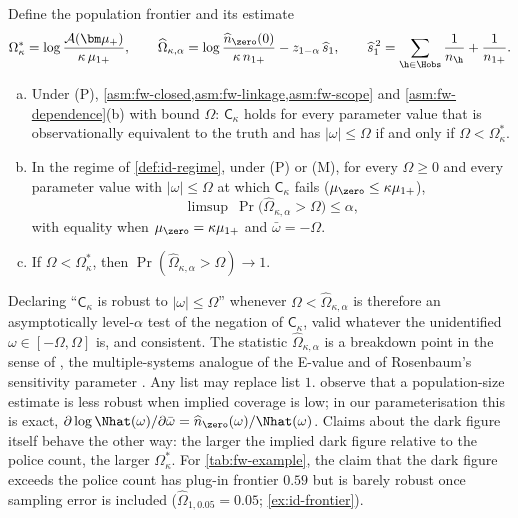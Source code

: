 \begin{theorem}\label{thm:id-frontier}
Define the population frontier and its estimate
\[
  \Omega^*_\kappa=\log\frac{\mathcal A(\bm\mu_+)}{\kappa\,\mu_{1+}},
  \qquad
  \widehat\Omega_{\kappa,\alpha}=\log\frac{\widehat n_{\zero}(0)}{\kappa\,n_{1+}}-z_{1-\alpha}\,\widehat s_1,
  \qquad
  \widehat s_1^{\,2}=\sum_{\h\in\Hobs}\frac1{n_{\h}}+\frac1{n_{1+}} .
\]
\begin{enumerate}[(a)]
  \item Under (P), \cref{asm:fw-closed,asm:fw-linkage,asm:fw-scope} and \cref{asm:fw-dependence}(b) with bound $\Omega$: $\mathsf C_\kappa$ holds for every parameter value that is observationally equivalent to the truth and has $|\omega|\le\Omega$ if and only if $\Omega<\Omega^*_\kappa$.
  \item In the regime of \cref{def:id-regime}, under (P) or (M), for every $\Omega\ge0$ and every parameter value with $|\omega|\le\Omega$ at which $\mathsf C_\kappa$ fails ($\mu_{\zero}\le\kappa\mu_{1+}$),
  \[
    \limsup\ \Pr\bigl(\widehat\Omega_{\kappa,\alpha}>\Omega\bigr)\le\alpha,
  \]
  with equality when $\mu_{\zero}=\kappa\mu_{1+}$ and $\bar\omega=-\Omega$.
  \item If $\Omega<\Omega^*_\kappa$, then $\Pr(\widehat\Omega_{\kappa,\alpha}>\Omega)\to1$.
\end{enumerate}
\end{theorem}

Declaring ``$\mathsf C_\kappa$ is robust to $|\omega|\le\Omega$'' whenever $\Omega<\widehat\Omega_{\kappa,\alpha}$ is therefore an asymptotically level-$\alpha$ test of the negation of $\mathsf C_\kappa$, valid whatever the unidentified $\omega\in[-\Omega,\Omega]$ is, and consistent. The statistic $\widehat\Omega_{\kappa,\alpha}$ is a breakdown point in the sense of \citet{masten2020}, the multiple-systems analogue of the E-value \citep{vanderweele2017} and of Rosenbaum's sensitivity parameter \citep{rosenbaum2002}. Any list may replace list $1$.  observe that a population-size estimate is less robust when implied coverage is low; in our parameterisation this is exact, $\partial\log\Nhat(\omega)/\partial\bar\omega=\widehat n_{\zero}(\omega)/\Nhat(\omega)$. Claims about the dark figure itself behave the other way: the larger the implied dark figure relative to the police count, the larger $\Omega^*_\kappa$. For \cref{tab:fw-example}, the claim that the dark figure exceeds the police count has plug-in frontier $0.59$ but is barely robust once sampling error is included ($\widehat\Omega_{1,0.05}=0.05$; \cref{ex:id-frontier}).


